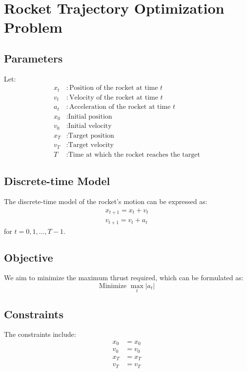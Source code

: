 \documentclass{article}
\begin{document}
\section*{Rocket Trajectory Optimization Problem}

\subsection*{Parameters}
Let:
\begin{align*}
x_t & : \text{Position of the rocket at time } t \\
v_t & : \text{Velocity of the rocket at time } t \\
a_t & : \text{Acceleration of the rocket at time } t \\
x_0 & : \text{Initial position} \\
v_0 & : \text{Initial velocity} \\
x_T & : \text{Target position} \\
v_T & : \text{Target velocity} \\
T & : \text{Time at which the rocket reaches the target}
\end{align*}

\subsection*{Discrete-time Model}
The discrete-time model of the rocket's motion can be expressed as:
\begin{align}
x_{t+1} = x_t + v_t \\
v_{t+1} = v_t + a_t
\end{align}
for \( t = 0, 1, \ldots, T-1 \).

\subsection*{Objective}
We aim to minimize the maximum thrust required, which can be formulated as:
\[
\text{Minimize } \max_{t} |a_t|
\]

\subsection*{Constraints}
The constraints include:
\begin{align}
x_0 & = x_0 \\
v_0 & = v_0 \\
x_T & = x_T \\
v_T & = v_T \\
\end{align}
\end{document}

